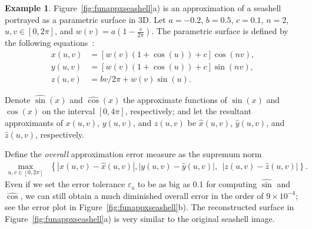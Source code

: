 \documentclass[review]{elsarticle}
\newcommand{\abstol}{\varepsilon_{\textrm{a}}}
\theoremstyle{definition}
\newtheorem{exmp}{Example}
\newcommand{\cosappx}{\widehat{\operatorname*{cos}}}
\newcommand{\sinappx}{\widehat{\operatorname*{sin}}}
\begin{document}
\begin{exmp}

Figure~\ref{fig:funappxseashell}a) is an approximation of a
seashell portrayed as a parametric surface in 3D. Let $a=-0.2$, $b=0.5$,
$c=0.1$, $n = 2$, $u,v \in [0, 2 \pi]$, and $w(v) =
a\left(1-\frac{v}{2\pi}\right)$. The parametric surface is defined by the
following equations~\cite{DavEtal04}:
\begin{align*}
x(u,v) & =   \left[ w(v) \left(1+\cos(u)\right) + c\right]\cos(nv),\\
y(u,v) & = \left[w(v) (1+\cos(u)) + c\right] \sin(nv),\\
z(u,v) & = {bv}/{2\pi} + w(v)\sin(u).
\end{align*}
%

Denote $\sinappx(x)$ and $\cosappx (x)$ the approximate functions of $\sin(x)$ and
$\cos(x)$ on the interval $[0,4\pi]$, respectively; and let the resultant
approximants of $x(u,v)$, $y(u,v)$, and $z(u,v)$ be $\hat{x}(u,v)$,
$\hat{y}(u,v)$, and $\hat{z}(u,v)$, respectively.

Define the \emph{overall} approximation error measure as the supremum norm
\begin{align*}
   \max\limits_{u,v \in [0, 2 \pi] } & \left\{   |x(u,v)-\hat{x}(u,v)|,\right.
   \left.  |y(u,v)-\hat{y}(u,v)|,
                                  \ \    |z(u,v)-\hat{z}(u,v)|\right\}.
\end{align*}
Even if we set the error tolerance $\abstol$ to be as big as $0.1$ for computing
$\sinappx$ and $\cosappx$, we can still obtain a much diminished overall error
in the order of $9 \times 10^{-4}$; see the error plot in
Figure~\ref{fig:funappxseashell}b). The reconstructed surface in
Figure~\ref{fig:funappxseashell}a) is very similar to the original seashell
image.
\end{exmp}
\end{document}
